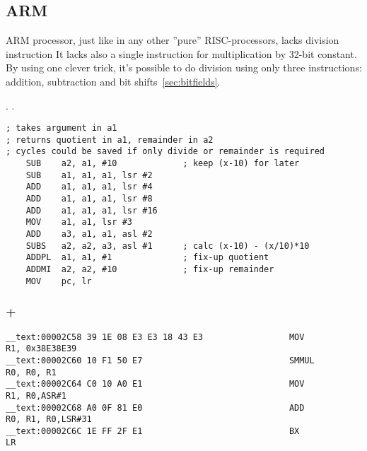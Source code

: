 

\subsection{ARM}

{ARM processor, just like in any other ''pure'' RISC-processors, lacks division instruction
It lacks also a single instruction for multiplication by 32-bit constant.}
{By using one clever trick, it's possible to do division using only three instructions: addition,
subtraction and bit shifts}~\ref{sec:bitfields}.

\cite[3.3 Division by a Constant]{ARM:1994}.
.

\begin{lstlisting}
; takes argument in a1
; returns quotient in a1, remainder in a2
; cycles could be saved if only divide or remainder is required
    SUB    a2, a1, #10             ; keep (x-10) for later
    SUB    a1, a1, a1, lsr #2
    ADD    a1, a1, a1, lsr #4
    ADD    a1, a1, a1, lsr #8
    ADD    a1, a1, a1, lsr #16
    MOV    a1, a1, lsr #3
    ADD    a3, a1, a1, asl #2
    SUBS   a2, a2, a3, asl #1      ; calc (x-10) - (x/10)*10
    ADDPL  a1, a1, #1              ; fix-up quotient
    ADDMI  a2, a2, #10             ; fix-up remainder
    MOV    pc, lr
\end{lstlisting}

\subsubsection{\OptimizingXcode + \ARMMode}

\begin{lstlisting}
__text:00002C58 39 1E 08 E3 E3 18 43 E3                 MOV             R1, 0x38E38E39
__text:00002C60 10 F1 50 E7                             SMMUL           R0, R0, R1
__text:00002C64 C0 10 A0 E1                             MOV             R1, R0,ASR#1
__text:00002C68 A0 0F 81 E0                             ADD             R0, R1, R0,LSR#31
__text:00002C6C 1E FF 2F E1                             BX              LR
\end{lstlisting}

